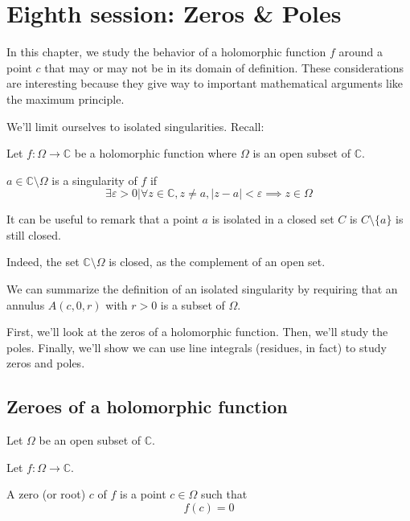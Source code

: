 \section{Eighth session: Zeros \& Poles}

In this chapter, we study the behavior of a holomorphic function $f$ around a point $c$ that may or may not be in its domain of definition. These considerations are interesting because they give way to important mathematical arguments like the maximum principle.

We'll limit ourselves to isolated singularities. Recall:
\begin{defi}
    Let $f: \Omega \rightarrow \mathbb{C}$ be a holomorphic function where $\Omega$ is an open subset of $\mathbb{C}$.
    
    $a\in\mathbb{C}\setminus\Omega$ is a singularity of $f$ if
    $$ \exists \varepsilon > 0 \vert \forall z\in\mathbb{C}, z \neq a, |z-a| < \varepsilon \implies z\in\Omega$$
\end{defi}

\begin{note}
    It can be useful to remark that a point $a$ is isolated in a closed set $C$ is $C\setminus \{a\}$ is still closed. 

    Indeed, the set $\mathbb{C}\setminus\Omega$ is closed, as the complement of an open set.
\end{note}

\begin{note}
    We can summarize the definition of an isolated singularity by requiring that an annulus $A(c, 0, r)$ with $r>0$ is a subset of $\Omega$.
\end{note}


First, we'll look at the zeros of a holomorphic function. Then, we'll study the poles. Finally, we'll show we can use line integrals (residues, in fact) to study zeros and poles.


\subsection{Zeroes of a holomorphic function}

\begin{defi}
    [Zero]
    Let $\Omega$ be an open subset of $\mathbb{C}$.

    Let $f: \Omega \rightarrow \mathbb{C}$.

    A zero (or root) $c$ of $f$ is a point $c\in\Omega$ such that $$ f(c) = 0$$
\end{defi}

